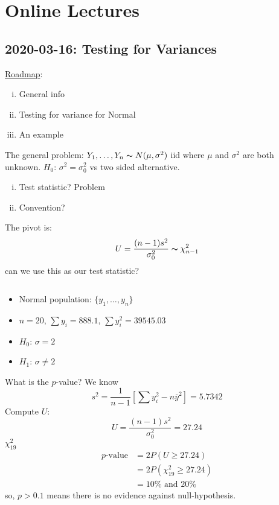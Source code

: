\chapter{Online Lectures}
\section{2020-03-16: Testing for Variances}
\underline{Roadmap}:
\begin{enumerate}[(i)]
    \item General info
    \item Testing for variance for Normal
    \item An example
\end{enumerate}
The general problem: $ Y_1,\ldots ,Y_n \thicksim N(\mu,\sigma^2)$ iid
where $ \mu $ and $ \sigma^2 $ are both unknown.
$ H_0 $: $ \sigma^2=\sigma_0^2 $ vs two sided alternative.
\begin{enumerate}[(i)]
    \item Test statistic? Problem
    \item Convention?
\end{enumerate}
The pivot is:
\[ U=\frac{(n-1)s^2}{\sigma_0^2} \thicksim \chi^2_{n-1} \]
can we use this as our test statistic?

\begin{exbox}
    \begin{example} $ \; $
        \begin{itemize}
            \item Normal population: $ \{y_1,\ldots ,y_n\} $
            \item $ n=20 $, $ \sum y_i=888.1 $, $ \sum y_i^2=39545.03 $
            \item $ H_0 $: $ \sigma=2 $
            \item $ H_1 $: $ \sigma\neq 2 $
        \end{itemize}
        What is the $ p $-value?
        We know
        \[ s^2=\frac{1}{n-1} \left[ \sum y_i^2-n\overline{y}^2 \right]=5.7342 \]
        Compute $ U $:
        \[ U=\frac{(n-1)s^2}{\sigma_0^2}=27.24 \]
        $ \chi^2_{19} $
        \begin{align*}
            p\text{-value}
             & =2P(U\geqslant 27.24)           \\
             & =2P(\chi^2_{19}\geqslant 27.24) \\
             & =10\%\text{ and }20\%
        \end{align*}
        so, $ p>0.1 $ means there is no evidence against null-hypothesis.
    \end{example}
\end{exbox}
